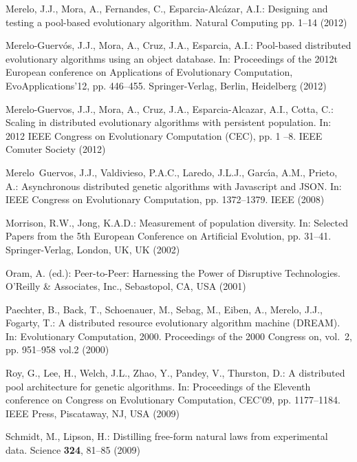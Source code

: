 \begin{thebibliography}{10}
Merelo, J.J., Mora, A., Fernandes, C., Esparcia-Alc{\'a}zar, A.I.: Designing
  and testing a pool-based evolutionary algorithm.
\newblock Natural Computing pp. 1--14 (2012)

Merelo-Guerv\'{o}s, J.J., Mora, A., Cruz, J.A., Esparcia, A.I.: Pool-based
  distributed evolutionary algorithms using an object database.
\newblock In: Proceedings of the 2012t European conference on Applications of
  Evolutionary Computation, EvoApplications'12, pp. 446--455. Springer-Verlag,
  Berlin, Heidelberg (2012)

Merelo-Guervos, J.J., Mora, A., Cruz, J.A., Esparcia-Alcazar, A.I., Cotta, C.:
  Scaling in distributed evolutionary algorithms with persistent population.
\newblock In: 2012 IEEE Congress on Evolutionary Computation (CEC), pp. 1 --8.
  IEEE Comuter Society (2012)

Merelo~Guervos, J.J., Valdivieso, P.A.C., Laredo, J.L.J., Garc{\'\i}a, A.M.,
  Prieto, A.: Asynchronous distributed genetic algorithms with {Javascript} and
  {JSON}.
\newblock In: IEEE Congress on Evolutionary Computation, pp. 1372--1379. IEEE
  (2008)

Morrison, R.W., Jong, K.A.D.: Measurement of population diversity.
\newblock In: Selected Papers from the 5th European Conference on Artificial
  Evolution, pp. 31--41. Springer-Verlag, London, UK, UK (2002)

Oram, A. (ed.): Peer-to-Peer: Harnessing the Power of Disruptive Technologies.
\newblock O'Reilly \& Associates, Inc., Sebastopol, CA, USA (2001)

Paechter, B., Back, T., Schoenauer, M., Sebag, M., Eiben, A., Merelo, J.J.,
  Fogarty, T.: A distributed resource evolutionary algorithm machine ({DREAM}).
\newblock In: Evolutionary Computation, 2000. Proceedings of the 2000 Congress
  on, vol.~2, pp. 951--958 vol.2 (2000)

Roy, G., Lee, H., Welch, J.L., Zhao, Y., Pandey, V., Thurston, D.: A
  distributed pool architecture for genetic algorithms.
\newblock In: Proceedings of the Eleventh conference on Congress on
  Evolutionary Computation, CEC'09, pp. 1177--1184. IEEE Press, Piscataway, NJ,
  USA (2009)

Schmidt, M., Lipson, H.: Distilling free-form natural laws from experimental
  data.
\newblock Science \textbf{324}, 81--85 (2009)


\end{thebibliography}
